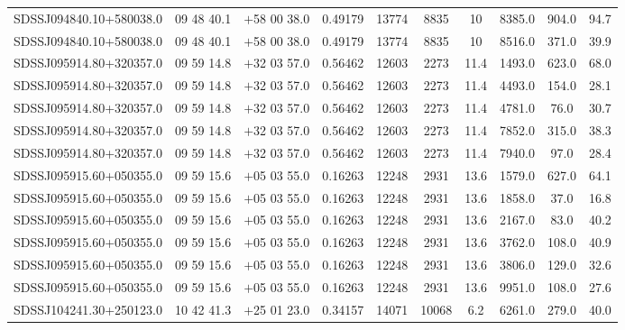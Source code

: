 \begin{landscape}
\begin{center}
\begin{longtable}{l c c c c c c c c c}
SDSSJ094840.10+580038.0  & 09 48 40.1  &         $+$58 00 38.0  &       0.49179  & 13774  &   8835  &       10  &        8385.0  &  904.0  &  94.7  \\
SDSSJ094840.10+580038.0  & 09 48 40.1  &         $+$58 00 38.0  &       0.49179  & 13774  &   8835  &       10  &        8516.0  &  371.0  &  39.9  \\
SDSSJ095914.80+320357.0  & 09 59 14.8  &         $+$32 03 57.0  &       0.56462  & 12603  &   2273  &       11.4  &      1493.0  &  623.0  &  68.0  \\
SDSSJ095914.80+320357.0  & 09 59 14.8  &         $+$32 03 57.0  &       0.56462  & 12603  &   2273  &       11.4  &      4493.0  &  154.0  &  28.1  \\
SDSSJ095914.80+320357.0  & 09 59 14.8  &         $+$32 03 57.0  &       0.56462  & 12603  &   2273  &       11.4  &      4781.0  &  76.0  &   30.7  \\
SDSSJ095914.80+320357.0  & 09 59 14.8  &         $+$32 03 57.0  &       0.56462  & 12603  &   2273  &       11.4  &      7852.0  &  315.0  &  38.3  \\
SDSSJ095914.80+320357.0  & 09 59 14.8  &         $+$32 03 57.0  &       0.56462  & 12603  &   2273  &       11.4  &      7940.0  &  97.0  &   28.4  \\
SDSSJ095915.60+050355.0  & 09 59 15.6  &         $+$05 03 55.0  &       0.16263  & 12248  &   2931  &       13.6  &      1579.0  &  627.0  &  64.1  \\
SDSSJ095915.60+050355.0  & 09 59 15.6  &         $+$05 03 55.0  &       0.16263  & 12248  &   2931  &       13.6  &      1858.0  &  37.0  &   16.8  \\
SDSSJ095915.60+050355.0  & 09 59 15.6  &         $+$05 03 55.0  &       0.16263  & 12248  &   2931  &       13.6  &      2167.0  &  83.0  &   40.2  \\
SDSSJ095915.60+050355.0  & 09 59 15.6  &         $+$05 03 55.0  &       0.16263  & 12248  &   2931  &       13.6  &      3762.0  &  108.0  &  40.9  \\
SDSSJ095915.60+050355.0  & 09 59 15.6  &         $+$05 03 55.0  &       0.16263  & 12248  &   2931  &       13.6  &      3806.0  &  129.0  &  32.6  \\
SDSSJ095915.60+050355.0  & 09 59 15.6  &         $+$05 03 55.0  &       0.16263  & 12248  &   2931  &       13.6  &      9951.0  &  108.0  &  27.6  \\
SDSSJ104241.30+250123.0  & 10 42 41.3  &         $+$25 01 23.0  &       0.34157  & 14071  &   10068  &      6.2  &       6261.0  &  279.0  &  40.0  \\

\end{longtable}
\end{center}
\end{landscape}
